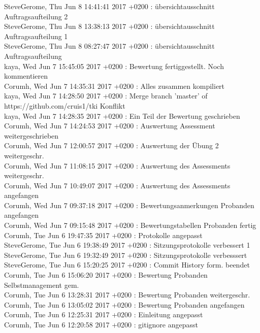SteveGerome, Thu Jun 8 14:41:41 2017 +0200 : übersichtausschnitt Auftragsaufteilung 2 \\
SteveGerome, Thu Jun 8 13:38:13 2017 +0200 : übersichtausschnitt Auftragsaufteilung 1 \\
SteveGerome, Thu Jun 8 08:27:47 2017 +0200 : übersichtausschnitt Auftragsaufteilung \\
kaya, Wed Jun 7 15:45:05 2017 +0200 : Bewertung fertiggestellt. Noch kommentieren \\
Corumh, Wed Jun 7 14:35:31 2017 +0200 : Alles zusammen kompiliert \\
kaya, Wed Jun 7 14:28:50 2017 +0200 : Merge branch 'master' of https://github.com/cruis1/tki Konflikt \\
kaya, Wed Jun 7 14:28:35 2017 +0200 : Ein Teil der Bewertung geschrieben \\
Corumh, Wed Jun 7 14:24:53 2017 +0200 : Auswertung Assessment weitergeschrieben \\
Corumh, Wed Jun 7 12:00:57 2017 +0200 : Auswertung der Übung 2 weitergeschr. \\
Corumh, Wed Jun 7 11:08:15 2017 +0200 : Auswertung des Assessments weitergeschr. \\
Corumh, Wed Jun 7 10:49:07 2017 +0200 : Auswertung des Assessments angefangen \\
Corumh, Wed Jun 7 09:37:18 2017 +0200 : Bewertungsanmerkungen Probanden angefangen \\
Corumh, Wed Jun 7 09:15:48 2017 +0200 : Bewertungstabellen Probanden fertig \\
Corumh, Tue Jun 6 19:47:35 2017 +0200 : Protokolle angepasst \\
SteveGerome, Tue Jun 6 19:38:49 2017 +0200 : Sitzungsprotokolle verbessert 1 \\
SteveGerome, Tue Jun 6 19:32:49 2017 +0200 : Sitzungsprotokolle verbesssert \\
SteveGerome, Tue Jun 6 15:20:25 2017 +0200 : Commit History form. beendet \\
Corumh, Tue Jun 6 15:06:20 2017 +0200 : Bewertung Probanden Selbstmanagement gem. \\
Corumh, Tue Jun 6 13:28:31 2017 +0200 : Bewertung Probanden weitergeschr. \\
Corumh, Tue Jun 6 13:05:02 2017 +0200 : Bewertung Probanden angefangen \\
Corumh, Tue Jun 6 12:25:31 2017 +0200 : Einleitung angepasst \\
Corumh, Tue Jun 6 12:20:58 2017 +0200 : gitignore angepasst \\
